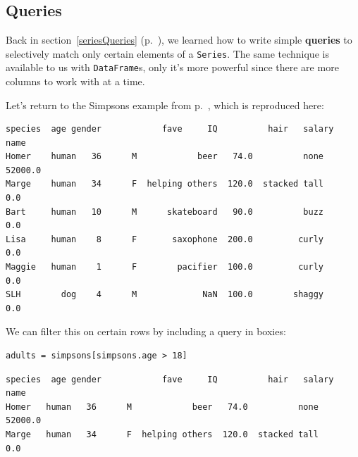 
\chapter[Tables in Python (3 of 3)]{\huge\selectfont{Tables in Python (3 of
3)}}
\label{tablesInPython3}

\section{Queries}

\label{queries}

Back in section~\ref{seriesQueries} (p.~\pageref{seriesQueries}), we learned
how to write simple \textbf{queries} to selectively match only certain elements
of a \texttt{Series}. The same technique is available to us with
\texttt{DataFrame}s, only it's more powerful since there are more columns to
work with at a time.


Let's return to the Simpsons example from p.~\pageref{finalSimpsons}, which is
reproduced here:

\begin{Verbatim}[fontsize=\CBCodeSmall,samepage=true,frame=leftline,framesep=5mm,framerule=1mm]
       species  age gender            fave     IQ          hair   salary
name                                                                    
Homer    human   36      M            beer   74.0          none  52000.0
Marge    human   34      F  helping others  120.0  stacked tall      0.0
Bart     human   10      M      skateboard   90.0          buzz      0.0
Lisa     human    8      F       saxophone  200.0         curly      0.0
Maggie   human    1      F        pacifier  100.0         curly      0.0
SLH        dog    4      M             NaN  100.0        shaggy      0.0
\end{Verbatim}


We can filter this on certain rows by including a query in boxies:


\begin{Verbatim}[fontsize=\normalsize,samepage=true,frame=single,framesep=3mm]
adults = simpsons[simpsons.age > 18]
\end{Verbatim}
\vspace{-.2in}

\begin{Verbatim}[fontsize=\CBCodeSmall,samepage=true,frame=leftline,framesep=5mm,framerule=1mm]
      species  age gender            fave     IQ          hair   salary
name                                                                   
Homer   human   36      M            beer   74.0          none  52000.0
Marge   human   34      F  helping others  120.0  stacked tall      0.0
\end{Verbatim}

